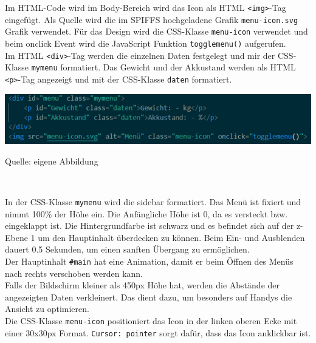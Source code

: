 \documentclass[ngerman,12pt,a4paper]{article}
\begin{document}
	Im HTML-Code wird im Body-Bereich wird das Icon als HTML \texttt{<img>}-Tag eingefügt. Als Quelle wird die im SPIFFS hochgeladene Grafik \texttt{menu-icon.svg} Grafik verwendet. Für das Design wird die CSS-Klasse \texttt{menu-icon} verwendet und beim onclick Event wird die JavaScript Funktion \texttt{togglemenu()} aufgerufen. \\[0.5cm]
	Im HTML \texttt{<div>}-Tag werden die einzelnen Daten festgelegt und mir der CSS-Klasse \texttt{mymenu} formatiert. Das Gewicht und der Akkustand werden als HTML \texttt{<p>}-Tag angezeigt und mit der CSS-Klasse \texttt{daten} formatiert. \\
	\begin{center}
		\begin{minipage}[t]{1\textwidth}
			\includegraphics{Pictures/sensordaten-html}
			\label{fig:sensordaten-html}
			\vspace{-10pt}
			\begin{center}
				\par\small Quelle: eigene Abbildung 
			\end{center}
		\end{minipage} \\[0.75cm]
	\end{center}
	In der CSS-Klasse \texttt{mymenu} wird die sidebar formatiert. Das Menü ist fixiert und nimmt 100\% der Höhe ein. Die Anfängliche Höhe ist 0, da es versteckt bzw. eingeklappt ist. Die Hintergrundfarbe ist schwarz und es befindet sich auf der z-Ebene 1 um den Hauptinhalt überdecken zu können. Beim Ein- und Ausblenden dauert 0.5 Sekunden, um einen sanften Übergang zu ermöglichen. \\[0.5cm]
	Der Hauptinhalt \texttt{\#main} hat eine Animation, damit er beim Öffnen des Menüs nach rechts verschoben werden kann. \\[0.5cm]
	Falls der Bildschirm kleiner als 450px Höhe hat, werden die Abstände der angezeigten Daten verkleinert. Das dient dazu, um besonders auf Handys die Ansicht zu optimieren. \\[0.5cm]
	Die CSS-Klasse \texttt{menu-icon} positioniert das Icon in der linken oberen Ecke mit einer 30x30px Format. \texttt{Cursor: pointer} sorgt dafür, dass das Icon anklickbar ist. \\[0.5cm]
\end{document}

